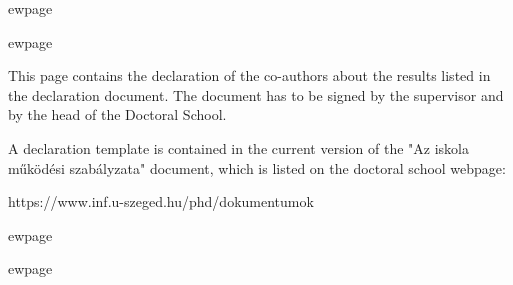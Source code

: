 \documentclass[12pt,a4paper]{extarticle}
\begin{document}


ewpage



ewpage

This page contains the declaration of the co-authors about the results listed in the declaration document. The document has to be signed by the supervisor and by the head of the Doctoral School. 

A declaration template is contained in the current version of the "Az iskola működési szabályzata" document, which is listed on the doctoral school webpage:

https://www.inf.u-szeged.hu/phd/dokumentumok



ewpage
\thispagestyle{empty}
\mbox{}

ewpage
\end{document}
